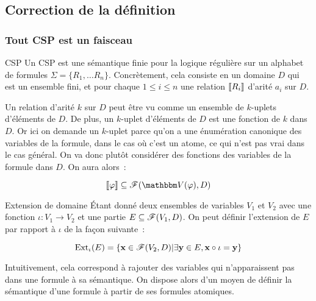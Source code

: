 \subsection{Correction de la définition}

\subsubsection{Tout CSP est un faisceau}

\begin{defi}{CSP}
    Un CSP est une sémantique finie pour la logique régulière sur un alphabet de formules 
    $\Sigma = \{R_1, \dots R_n\}$. Concrètement, cela consiste en un domaine $D$ qui est
    un ensemble fini, et pour chaque $1\leq i\leq n$ une relation $\llbracket {R_i} \rrbracket$
    d'arité $a_i$ sur $D$.
\end{defi}

\begin{rem}
    Un relation d'arité $k$ sur $D$ peut être vu comme un ensemble de $k$-uplets
    d'éléments de $D$. De plus, un $k$-uplet d'éléments de $D$ est une fonction de
    $k$ dans $D$. Or ici on demande un $k$-uplet parce qu'on a une énumération canonique
    des variables de la formule, dans le cas où c'est un atome, ce qui n'est pas vrai
    dans le cas général. On va donc plutôt considérer des fonctions des variables de
    la formule dans $D$. On aura alors~:

    \[ \sem{\phi}\subseteq \fns(\V(\phi), D) \]
\end{rem}

\begin{defi}{Extension de domaine}
    Étant donné deux ensembles de variables $V_1$ et $V_2$ avec une fonction
    $\iota : V_1 \rightarrow V_2$ et une partie $E\subseteq\mathscr{F}(V_1, D)$. On peut définir
    l'extension de $E$ par rapport à $\iota$ de la façon suivante~:

    \[ \text{Ext}_\iota(E) = \{\mathbf{x}\in\mathscr{F}(V_2,D)
                        | \exists \mathbf{y}\in E, \mathbf{x}\circ\iota = \mathbf{y} \} \]
\end{defi}

Intuitivement, cela correspond à rajouter des variables qui n'apparaissent pas dans une
formule à sa sémantique. On dispose alors d'un moyen de définir la sémantique d'une
formule à partir de ses formules atomiques.

